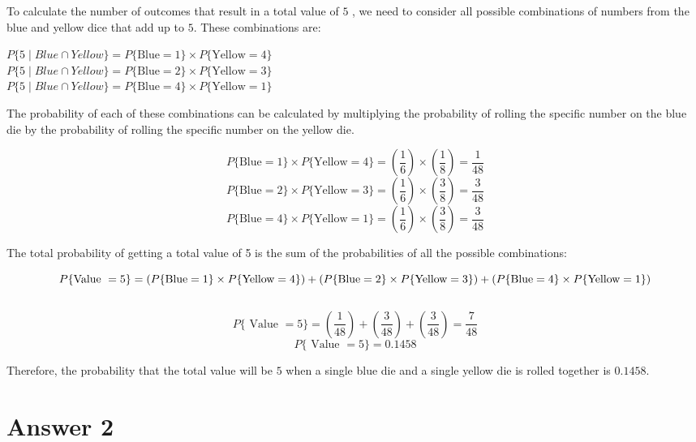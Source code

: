\documentclass[12pt]{article}
\begin{document}
To calculate the number of outcomes that result in a total value of $5$ , we need to consider all possible combinations of numbers from the blue and yellow dice that add up to $5$. These combinations are:
\begin{center}
$P\{5 \mid Blue \cap Yellow\} = P\{\text{Blue} = 1\} \times P\{ \text{Yellow}= 4\}$\\
$P\{5 \mid Blue \cap Yellow\} =P\{\text{Blue} = 2\} \times P\{ \text{Yellow}= 3\}$\\
$P\{5 \mid Blue \cap Yellow\} =P\{\text{Blue} = 4\} \times P\{ \text{Yellow}= 1\}$\\

\end{center}


The probability of each of these combinations can be calculated by multiplying the probability of rolling the specific number on the blue die by the probability of rolling the specific number on the yellow die.\\
\begin{center}
$$P\{\text{Blue} = 1\} \times P\{ \text{Yellow}= 4\} = (\frac{1}{6}) \times(\frac{1}{8})= \frac{1}{48}$$
$$P\{\text{Blue} = 2\} \times P\{ \text{Yellow}= 3\}=(\frac{1}{6}) \times (\frac{3}{8})=\frac{3}{48}$$
$$P\{\text{Blue} = 4\} \times P\{ \text{Yellow}= 1\}=(\frac{1}{6}) \times (\frac{3}{8})=\frac{3}{48}$$
\end{center}


The total probability of getting a total value of 5 is the sum of the probabilities of all the possible combinations:\\
\begin{center}
$$P\{\text{Value } = 5\} = (P\{\text{Blue} = 1\} \times P\{ \text{Yellow}= 4\} )+\\ (P\{\text{Blue} = 2\} \times P\{ \text{Yellow}= 3\}) + (P\{\text{Blue} = 4\} \times P\{ \text{Yellow}= 1\}) $$\\
$$P\{\text{ Value } = 5\} = (\frac{1}{48})+(\frac{3}{48})+(\frac{3}{48})=\frac{7}{48} $$
$$P\{\text{ Value } = 5\} = 0.1458 $$
\end{center}

Therefore, the probability that the total value will be $5$ when a single blue die and a single yellow die is rolled together is $0.1458$.

\section*{Answer 2}
\end{document}

